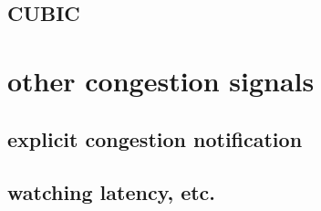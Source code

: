 \subsection{CUBIC}



\section{other congestion signals}



\subsection{explicit congestion notification}


\subsection{watching latency, etc.}


